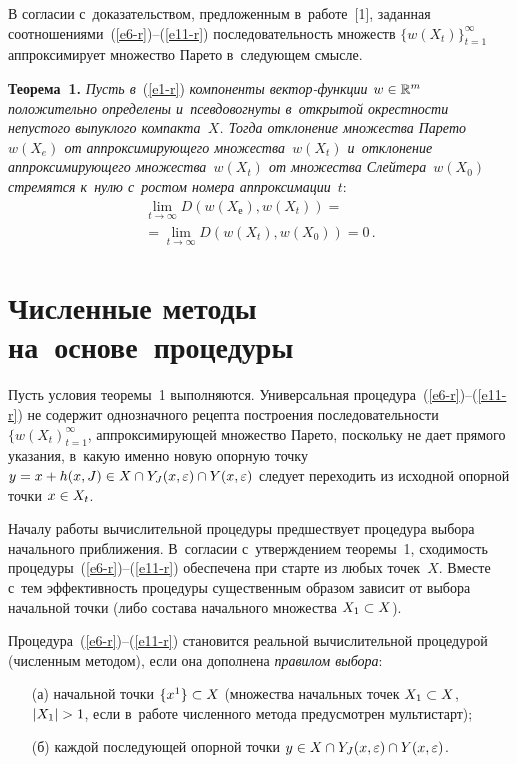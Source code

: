 \begin{multicols}{2}
  В согласии с~доказательством, предложенным в~работе~[1], заданная 
соотношениями~(\ref{e6-r})--(\ref{e11-r}) последовательность множеств $\{ 
w(X_t)\}^\infty_{t=1}$ аппроксимирует множество Парето в~следующем 
смысле.
  
  \smallskip
  
  \noindent
  \textbf{Теорема~1.} \textit{Пусть в}~(\ref{e1-r}) \textit{компоненты  
век\-тор-функ\-ции $w\hm\in \mathbb{R}^m$ положительно определены 
и~псевдовогнуты в~открытой окрестности непустого выпуклого 
компакта~$X$. Тогда отклонение множества Парето $w(X_{e})$ 
от аппроксимирующего множества~$w(X_t)$ и~отклонение 
аппроксимирующего множества~$w(X_t)$ от множества 
Слейтера~$w(X_0)$ стремятся к~нулю с~рос\-том номера 
аппроксимации}~$t$:
\begin{multline*}
  \lim\limits_{t\to\infty} D\left( w(X_{\mathrm{е}}), 
w(X_t)\right)={}\\
{}=\lim\limits_{t\to\infty} D\left( w(X_t), w(X_0)\right)=0\,.
\end{multline*}

\section{Численные методы на~основе~процедуры}

  Пусть условия теоремы~1 выполняются. Универсальная  
процедура~(\ref{e6-r})--(\ref{e11-r}) не содержит однозначного рецепта 
построения последовательности $\{ w(X_t)^\infty_{t=1}$, 
аппроксимирующей множество Парето, поскольку не дает прямого указания, 
в~какую именно новую опорную точку $y\hm= x\hm+ h(x,J)\hm\in X\cap 
Y_J(x,\varepsilon)\cap Y(x,\varepsilon)$ следует переходить из исходной 
опорной точки $x\hm\in X_t$.
  
  Началу работы вычислительной процедуры предшествует процедура 
выбора начального приближения. В~согласии с~утверж\-де\-ни\-ем  
тео\-ре\-мы~1, сходимость процедуры~(\ref{e6-r})--(\ref{e11-r}) обеспечена 
при старте из любых точек~$X$. Вмес\-те с~тем эффективность процедуры 
существенным образом зависит от выбора начальной точки (либо состава 
начального множества $X_1\hm\subset X$).
  
  Процедура~(\ref{e6-r})--(\ref{e11-r}) становится реальной вы\-чис\-ли\-тель\-ной 
процедурой (численным методом), если она дополнена \textit{правилом 
выбора}:
  \begin{itemize}
  \item[(а)] начальной точки $\{x^1\}\hm\subset X$ (множества начальных 
точек $X_1\hm\subset X$, $\vert X_1\vert \hm>1$, если в~работе численного 
метода предусмотрен мультистарт);
  \item[(б)] каждой последующей опорной точки $y\hm \in X\hm\cap 
Y_J(x,\varepsilon) \hm\cap Y(x,\varepsilon)$.
  \end{itemize}
  

\end{multicols}
